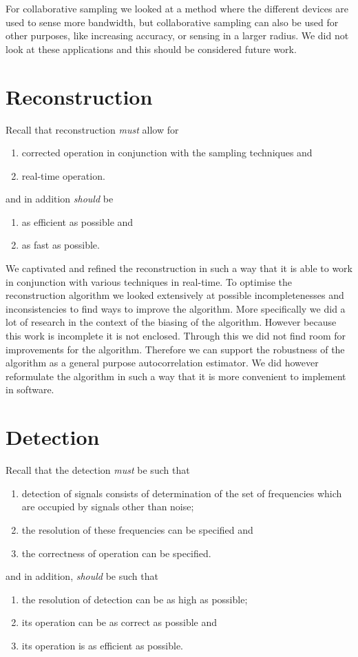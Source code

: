 \documentclass[a4paper, openany, oneside]{memoir}
\begin{document}
For collaborative sampling we looked at a method where the different devices are used to sense more bandwidth, but collaborative sampling can also be used for other purposes, like increasing accuracy, or sensing in a larger radius. We did not look at these applications and this should be considered future work.

\section{Reconstruction}
Recall that reconstruction \emph{must} allow for
\begin{enumerate}
    \item corrected operation in conjunction with the sampling techniques and
    \item real-time operation.
\end{enumerate}
and in addition \emph{should} be
\begin{enumerate}
    \item as efficient as possible and
    \item as fast as possible.
\end{enumerate}

We captivated and refined the reconstruction in such a way that it is able to work in conjunction with various techniques in real-time. To optimise the reconstruction algorithm we looked extensively at possible incompletenesses and inconsistencies to find ways to improve the algorithm. More specifically we did a lot of research in the context of the biasing of the algorithm. However because this work is incomplete it is not enclosed.  Through this we did not find room for improvements for the algorithm. Therefore we can support the robustness of the algorithm as a general purpose autocorrelation estimator. We did however reformulate the algorithm in such a way that it is more convenient to implement in software.

\section{Detection}
Recall that the detection \emph{must} be such that
\begin{enumerate}
    \item detection of signals consists of determination of the set of frequencies which are occupied by signals other than noise;
    \item the resolution of these frequencies can be specified and
    \item the correctness of operation can be specified.
\end{enumerate}
and in addition, \emph{should} be such that
\begin{enumerate}
    \item the resolution of detection can be as high as possible;
    \item its operation can be as correct as possible and
    \item its operation is as efficient as possible.
\end{enumerate}
\end{document}
